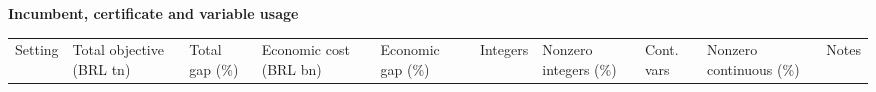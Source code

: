\documentclass[
  english,
  11pt,
  a4paper,
]{article}
\newcounter{none} %
\begin{document}
\textbf{Incumbent, certificate and variable usage}

{\def\LTcaptype{none} %
\begingroup\footnotesize
\begin{longtable}[]{@{}
  >{\raggedright\arraybackslash}p{}
  >{\raggedright\arraybackslash}p{}
  >{\raggedright\arraybackslash}p{}
  >{\raggedright\arraybackslash}p{}
  >{\raggedright\arraybackslash}p{}
  >{\raggedright\arraybackslash}p{}
  >{\raggedright\arraybackslash}p{}
  >{\raggedright\arraybackslash}p{}
  >{\raggedright\arraybackslash}p{}
  >{\raggedright\arraybackslash}p{}@{}}
\toprule\noalign{}
\begin{minipage}[b]{\linewidth}\raggedright
Setting
\end{minipage} & \begin{minipage}[b]{\linewidth}\raggedright
Total objective (BRL tn)
\end{minipage} & \begin{minipage}[b]{\linewidth}\raggedright
Total gap (\%)
\end{minipage} & \begin{minipage}[b]{\linewidth}\raggedright
Economic cost (BRL bn)
\end{minipage} & \begin{minipage}[b]{\linewidth}\raggedright
Economic gap (\%)
\end{minipage} & \begin{minipage}[b]{\linewidth}\raggedright
Integers
\end{minipage} & \begin{minipage}[b]{\linewidth}\raggedright
Nonzero integers (\%)
\end{minipage} & \begin{minipage}[b]{\linewidth}\raggedright
Cont. vars
\end{minipage} & \begin{minipage}[b]{\linewidth}\raggedright
Nonzero continuous (\%)
\end{minipage} & \begin{minipage}[b]{\linewidth}\raggedright
Notes
\end{minipage} \\

\end{longtable}}
\end{document}
